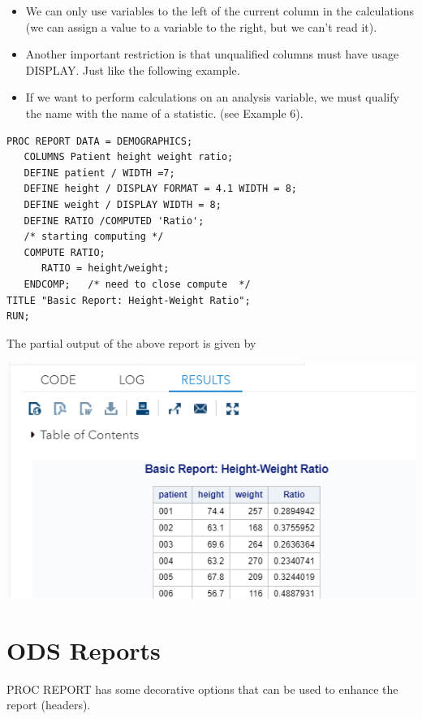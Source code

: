 \documentclass[
]{book}
\begin{document}
\begin{itemize}
\item
  We can only use variables to the left of the current column
  in the calculations (we can assign a value to a variable to
  the right, but we can't read it).
\item
  Another important restriction is that unqualified columns
  must have usage DISPLAY. Just like the following example.
\item
  If we want to perform calculations on an analysis variable,
  we must qualify the name with the name of a statistic. (see
  Example 6).
\end{itemize}

\begin{verbatim}
PROC REPORT DATA = DEMOGRAPHICS;
   COLUMNS Patient height weight ratio;
   DEFINE patient / WIDTH =7;
   DEFINE height / DISPLAY FORMAT = 4.1 WIDTH = 8;  
   DEFINE weight / DISPLAY WIDTH = 8;
   DEFINE RATIO /COMPUTED 'Ratio';
   /* starting computing */
   COMPUTE RATIO;
      RATIO = height/weight;
   ENDCOMP;   /* need to close compute  */
TITLE "Basic Report: Height-Weight Ratio";
RUN;
\end{verbatim}

The partial output of the above report is given by

\begin{center}\includegraphics[width=1\linewidth]{img13/w13-example03-output} \end{center}

\hypertarget{ods-reports}{%
\section{ODS Reports}\label{ods-reports}}

PROC REPORT has some decorative options that can be used to enhance the report (headers).
\end{document}
